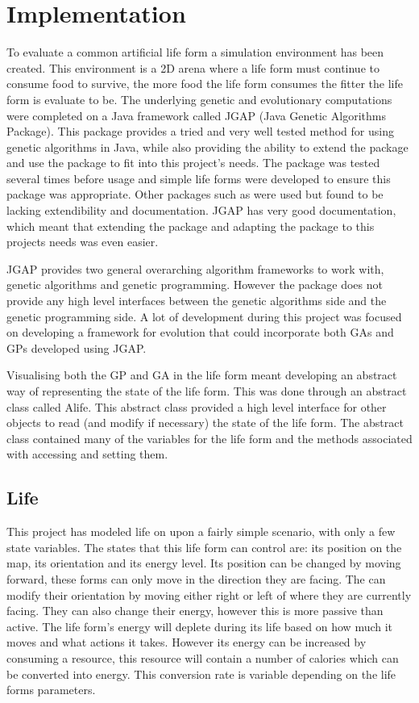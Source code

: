 \documentclass[12pt]{article}
\begin{document}
\section{Implementation}
To evaluate a common artificial life form a simulation environment has been created.
This environment is a 2D arena where a life form must continue to consume food to survive, the more food the life form consumes the fitter the  
life form is evaluate to be.
The underlying genetic and evolutionary computations were completed on a Java framework called JGAP (Java Genetic Algorithms Package).
This package provides a tried and very well tested method for using genetic algorithms in Java, while also providing the 
ability to extend the package and use the package to fit into this project's needs. The package was tested several times before usage
and simple life forms were developed to ensure this package was appropriate. Other packages such as %
were used but found to be lacking extendibility and documentation. JGAP has very good documentation, which meant that extending
the package and adapting the package to this projects needs was even easier.

JGAP provides two general overarching algorithm frameworks to work with, genetic algorithms and genetic programming. However
the package does not provide any high level interfaces between the genetic algorithms side and the genetic programming side. A 
lot of development during this project was focused on developing a framework for evolution that could incorporate both GAs and GPs developed
using JGAP. 

Visualising both the GP and GA in the life form meant developing an abstract way of representing the state of the life form. This was done
through an abstract class called Alife. This abstract class provided a high level interface for other objects to read (and modify if necessary)
the state of the life form. The abstract class contained many of the variables for the life form and the methods associated with accessing and
setting them.

\subsection{Life}

This project has modeled life on upon a fairly simple scenario, with only a few state variables. The states that this life form
can control are: its position on the map, its orientation and its energy level. Its position can be changed by moving forward, these 
forms can only move in the direction they are facing. The can modify their orientation by moving either right or left of where they 
are currently facing. They can also change their energy, however this is more passive than active. The life form's energy will
deplete during its life based on how much it moves and what actions it takes. However its energy can be increased by consuming a 
resource, this resource will contain a number of calories which can be converted into energy. This conversion rate is variable
depending on the life forms parameters. 
\end{document}
